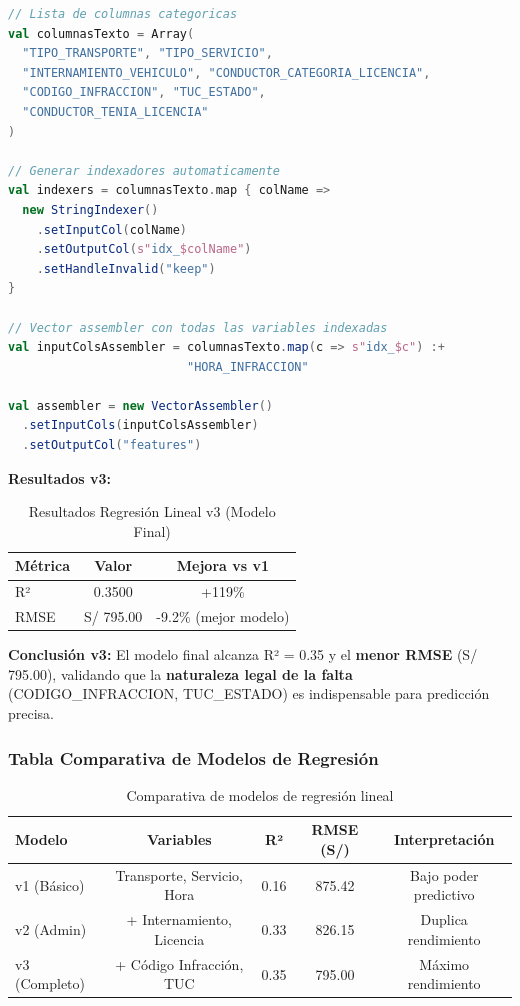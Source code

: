 \documentclass[12pt,a4paper]{article}
\begin{document}
\begin{lstlisting}[language=Scala, caption={Regresión Lineal v3 - Modelo completo con generación dinámica}]
// Lista de columnas categoricas
val columnasTexto = Array(
  "TIPO_TRANSPORTE", "TIPO_SERVICIO", 
  "INTERNAMIENTO_VEHICULO", "CONDUCTOR_CATEGORIA_LICENCIA", 
  "CODIGO_INFRACCION", "TUC_ESTADO", 
  "CONDUCTOR_TENIA_LICENCIA"
)

// Generar indexadores automaticamente
val indexers = columnasTexto.map { colName =>
  new StringIndexer()
    .setInputCol(colName)
    .setOutputCol(s"idx_$colName")
    .setHandleInvalid("keep")
}

// Vector assembler con todas las variables indexadas
val inputColsAssembler = columnasTexto.map(c => s"idx_$c") :+ 
                         "HORA_INFRACCION"

val assembler = new VectorAssembler()
  .setInputCols(inputColsAssembler)
  .setOutputCol("features")
\end{lstlisting}

\textbf{Resultados v3:}

\begin{table}[H]
\centering
\begin{tabular}{lcc}
\toprule
\textbf{Métrica} & \textbf{Valor} & \textbf{Mejora vs v1} \\
\midrule
R² & 0.3500 & +119\% \\
RMSE & S/ 795.00 & -9.2\% (mejor modelo) \\
\bottomrule
\end{tabular}
\caption{Resultados Regresión Lineal v3 (Modelo Final)}
\label{tab:lr_v3}
\end{table}

\textbf{Conclusión v3:} El modelo final alcanza R² = 0.35 y el \textbf{menor RMSE} (S/ 795.00), validando que la \textbf{naturaleza legal de la falta} (CODIGO\_INFRACCION, TUC\_ESTADO) es indispensable para predicción precisa.

\subsubsection{Tabla Comparativa de Modelos de Regresión}

\begin{table}[H]
\centering
\begin{tabular}{lcccc}
\toprule
\textbf{Modelo} & \textbf{Variables} & \textbf{R²} & \textbf{RMSE (S/)} & \textbf{Interpretación} \\
\midrule
v1 (Básico) & Transporte, Servicio, Hora & 0.16 & 875.42 & Bajo poder predictivo \\
v2 (Admin) & + Internamiento, Licencia & 0.33 & 826.15 & Duplica rendimiento \\
v3 (Completo) & + Código Infracción, TUC & 0.35 & 795.00 & Máximo rendimiento \\
\bottomrule
\end{tabular}
\caption{Comparativa de modelos de regresión lineal}
\label{tab:lr_comparativa}
\end{table}
\end{document}
